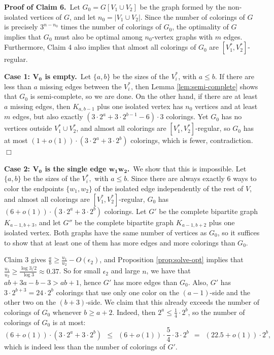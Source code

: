 \documentclass[11pt]{article}
\begin{document}
\noindent \textbf{Proof of Claim 6.}\, Let $G_0 = G[V_1 \cup V_2]$ be
the graph formed by the non-isolated vertices of $G$, and let $n_0 =
|V_1 \cup V_2|$.  Since the number of colorings of $G$ is precisely
$3^{n - n_0}$ times the number of colorings of $G_0$, the optimality
of $G$ implies that $G_0$ must also be optimal among $n_0$-vertex
graphs with $m$ edges.  Furthermore, Claim 4 also implies that almost
all colorings of $G_0$ are $[V_1^*, V_2^*]$-regular.


\vspace{2mm}


\textbf{Case 1: $\boldsymbol{V_0}$ is empty.}\, Let $\{a,b\}$ be the
sizes of the $V_i^*$, with $a \leq b$.  If there are less than $a$
missing edges between the $V_i^*$, then Lemma \ref{lem:semi-complete}
shows that $G_0$ is semi-complete, so we are done.  On the other hand,
if there are at least $a$ missing edges, then $K_{a, b - 1}$ plus one
isolated vertex has $n_0$ vertices and at least $m$ edges, but also
exactly $(3 \cdot 2^a + 3 \cdot 2^{b-1} - 6) \cdot 3$ colorings.  Yet
$G_0$ has no vertices outside $V_1^* \cup V_2^*$, and almost all
colorings are $[V_1^*, V_2^*]$-regular, so $G_0$ has at most $(1+o(1))
\cdot (3 \cdot 2^a + 3 \cdot 2^b )$ colorings, which is fewer,
contradiction. \hfill $\Box$



\vspace{2mm}



\textbf{Case 2: $\boldsymbol{V_0}$ is the single edge $\boldsymbol{w_1
    w_2}$.}\, We show that this is impossible.  Let $\{a,b\}$ be the
sizes of the $V_i^*,$ with $a \leq b$.  Since there are always exactly
6 ways to color the endpoints $\{w_1, w_2\}$ of the isolated edge
independently of the rest of $V$, and almost all colorings are
$[V_1^*, V_2^*]$-regular, $G_0$ has $(6+o(1)) \cdot ( 3 \cdot 2^a + 3
\cdot 2^b )$ colorings.  Let $G'$ be the complete bipartite graph
$K_{a-1, b+3}$, and let $G''$ be the complete bipartite graph $K_{a-1,
  b+2}$ plus one isolated vertex.  Both graphs have the same number of
vertices as $G_0$, so it suffices to show that at least one of them
has more edges and more colorings than $G_0$.

Claim 3 gives $\frac{a}{b} \geq \frac{u_1}{u_2} - O(\epsilon_2)$, and
Proposition \ref{prop:solve-opt} implies that $\frac{u_1}{u_2} \geq
\frac{\log 3/2}{\log 3} \approx 0.37$.  So for small $\epsilon_2$ and
large $n$, we have that $ab + 3a - b - 3 > ab+1$, hence $G'$ has more
edges than $G_0$.  Also, $G'$ has $3 \cdot 2^{b+3} = 24 \cdot 2^b$
colorings that use only one color on the $(a-1)$-side and the other
two on the $(b+3)$-side.  We claim that this already exceeds the
number of colorings of $G_0$ whenever $b \geq a+2$.  Indeed, then $2^a
\leq \frac{1}{4} \cdot 2^b$, so the number of colorings of $G_0$ is at
most:
\begin{displaymath}
  (6+o(1)) \cdot ( 3 \cdot 2^a + 3 \cdot 2^b )
  \ \ \leq \ \ 
  (6+o(1)) \cdot \frac{5}{4} \cdot 3 \cdot 2^b
  \ \ = \ \
  (22.5 + o(1)) \cdot 2^b,
\end{displaymath}
which is indeed less than the number of colorings of $G'$.
\end{document}
